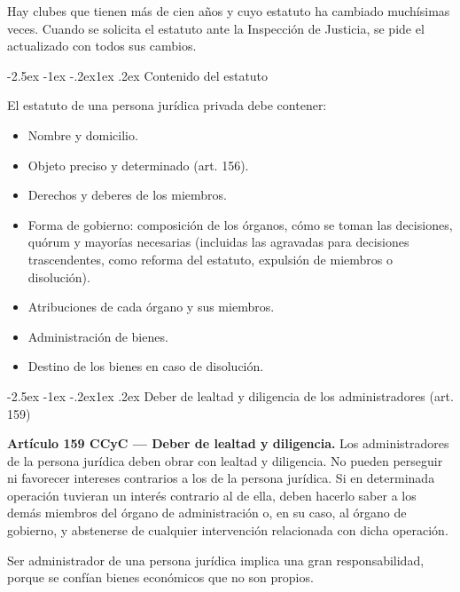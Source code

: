 \documentclass[12pt,oneside]{book}
\makeatletter
\renewcommand\subsection{\@startsection{subsection}{2}{\z@}%
  {-2.5ex \@plus -1ex \@minus -.2ex}{1ex \@plus .2ex}%
  {\normalfont\normalsize\bfseries}}
\makeatother
\begin{document}
\begin{nota}
Hay clubes que tienen más de cien años y cuyo estatuto ha cambiado muchísimas veces. Cuando se solicita el estatuto ante la Inspección de Justicia, se pide el actualizado con todos sus cambios.
\end{nota}

\subsection{Contenido del estatuto}

El estatuto de una persona jurídica privada debe contener:

\begin{itemize}
    \item Nombre y domicilio.
    \item Objeto preciso y determinado (art. 156).
    \item Derechos y deberes de los miembros.
    \item Forma de gobierno: composición de los órganos, cómo se toman las decisiones, quórum y mayorías necesarias (incluidas las agravadas para decisiones trascendentes, como reforma del estatuto, expulsión de miembros o disolución).
    \item Atribuciones de cada órgano y sus miembros.
    \item Administración de bienes.
    \item Destino de los bienes en caso de disolución.
\end{itemize}

\subsection{Deber de lealtad y diligencia de los administradores (art. 159)}

\begin{importante}
\textbf{Artículo 159 CCyC --- Deber de lealtad y diligencia.} Los administradores de la persona jurídica deben obrar con lealtad y diligencia. No pueden perseguir ni favorecer intereses contrarios a los de la persona jurídica. Si en determinada operación tuvieran un interés contrario al de ella, deben hacerlo saber a los demás miembros del órgano de administración o, en su caso, al órgano de gobierno, y abstenerse de cualquier intervención relacionada con dicha operación.
\end{importante}

Ser administrador de una persona jurídica implica una gran responsabilidad, porque se confían bienes económicos que no son propios.
\end{document}
